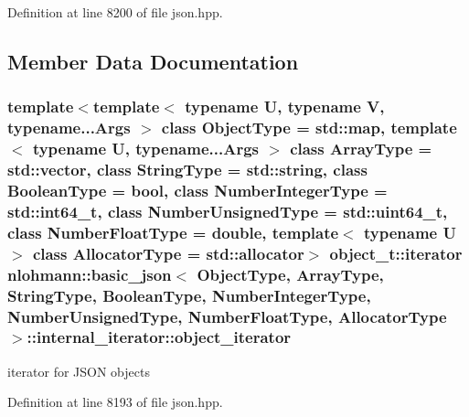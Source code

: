 Definition at line 8200 of file json.\+hpp.



\subsection{Member Data Documentation}
\hypertarget{structnlohmann_1_1basic__json_1_1internal__iterator_abad8000f0a29137d6f88e8cc61ef42f9}{}
\subsubsection[{object\+\_\+iterator}]{\setlength{\rightskip}{0pt plus 5cm}template$<$template$<$ typename U, typename V, typename...\+Args $>$ class Object\+Type = std\+::map, template$<$ typename U, typename...\+Args $>$ class Array\+Type = std\+::vector, class String\+Type  = std\+::string, class Boolean\+Type  = bool, class Number\+Integer\+Type  = std\+::int64\+\_\+t, class Number\+Unsigned\+Type  = std\+::uint64\+\_\+t, class Number\+Float\+Type  = double, template$<$ typename U $>$ class Allocator\+Type = std\+::allocator$>$ object\+\_\+t\+::iterator {\bf nlohmann\+::basic\+\_\+json}$<$ Object\+Type, Array\+Type, String\+Type, Boolean\+Type, Number\+Integer\+Type, Number\+Unsigned\+Type, Number\+Float\+Type, Allocator\+Type $>$\+::internal\+\_\+iterator\+::object\+\_\+iterator}\label{structnlohmann_1_1basic__json_1_1internal__iterator_abad8000f0a29137d6f88e8cc61ef42f9}


iterator for J\+S\+O\+N objects 



Definition at line 8193 of file json.\+hpp.

\hypertarget{structnlohmann_1_1basic__json_1_1internal__iterator_af92f51f4d6c715e46b1e1f8dface2be9}{}
